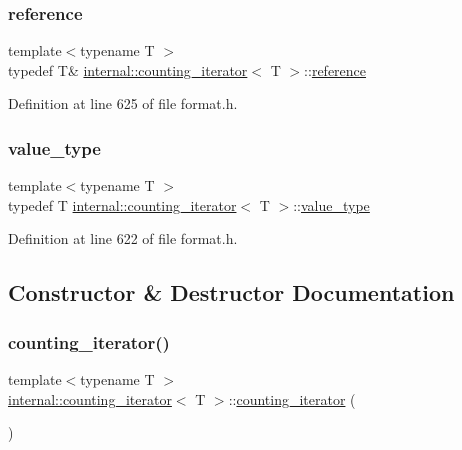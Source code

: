\subsubsection{\texorpdfstring{reference}{reference}}
{\footnotesize\ttfamily template$<$typename T $>$ \\
typedef T\& \hyperlink{classinternal_1_1counting__iterator}{internal\+::counting\+\_\+iterator}$<$ T $>$\+::\hyperlink{classinternal_1_1counting__iterator_a040c67c71ec6569100eda9296fbd914f}{reference}}



Definition at line 625 of file format.\+h.

\mbox{\label{classinternal_1_1counting__iterator_abc8a1cdd0ab07ab8a4c02df99233017a}} 
\subsubsection{\texorpdfstring{value\+\_\+type}{value\_type}}
{\footnotesize\ttfamily template$<$typename T $>$ \\
typedef T \hyperlink{classinternal_1_1counting__iterator}{internal\+::counting\+\_\+iterator}$<$ T $>$\+::\hyperlink{classinternal_1_1counting__iterator_abc8a1cdd0ab07ab8a4c02df99233017a}{value\+\_\+type}}



Definition at line 622 of file format.\+h.



\subsection{Constructor \& Destructor Documentation}
\mbox{\label{classinternal_1_1counting__iterator_af6e3751c9b296b56d7b96975b746abfe}} 
\subsubsection{\texorpdfstring{counting\+\_\+iterator()}{counting\_iterator()}}
{\footnotesize\ttfamily template$<$typename T $>$ \\
\hyperlink{classinternal_1_1counting__iterator}{internal\+::counting\+\_\+iterator}$<$ T $>$\+::\hyperlink{classinternal_1_1counting__iterator}{counting\+\_\+iterator} (\begin{DoxyParamCaption}{ }\end{DoxyParamCaption})\hspace{0.3cm}{\ttfamily [inline]}}



